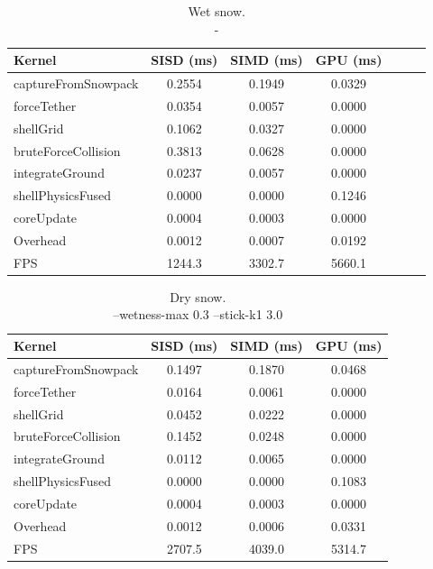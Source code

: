\begin{table}[H]
  \caption{Wet snow. \\-}
  \label{tab:jetson_scenario1_timing}
  \centering
  \scriptsize
  \begin{tabular}{@{}lcccccc@{}}
    \toprule
    \textbf{Kernel} & \textbf{SISD (ms)} & \textbf{SIMD (ms)} & \textbf{GPU (ms)} \\
    \midrule
    captureFromSnowpack           & 0.2554 & 0.1949 & 0.0329 \\
    forceTether                   & 0.0354 & 0.0057 & 0.0000 \\
    shellGrid                     & 0.1062 & 0.0327 & 0.0000 \\
    bruteForceCollision           & 0.3813 & 0.0628 & 0.0000 \\
    integrateGround               & 0.0237 & 0.0057 & 0.0000 \\
    shellPhysicsFused             & 0.0000 & 0.0000 & 0.1246 \\
    coreUpdate                    & 0.0004 & 0.0003 & 0.0000 \\
    Overhead                      & 0.0012 & 0.0007 & 0.0192 \\
    \bottomrule
    FPS                           & 1244.3 & 3302.7 & 5660.1
  \end{tabular}
\end{table}

\begin{table}[H]
  \caption{Dry snow.\\--wetness-max 0.3 --stick-k1 3.0}
  \label{tab:jetson_scenario2_timing}
  \centering
  \scriptsize
  \begin{tabular}{@{}lccc@{}}
    \toprule
    \textbf{Kernel} & \textbf{SISD (ms)} & \textbf{SIMD (ms)} & \textbf{GPU (ms)} \\
    \midrule
    captureFromSnowpack           & 0.1497 & 0.1870 & 0.0468 \\
    forceTether                   & 0.0164 & 0.0061 & 0.0000 \\
    shellGrid                     & 0.0452 & 0.0222 & 0.0000 \\
    bruteForceCollision           & 0.1452 & 0.0248 & 0.0000 \\
    integrateGround               & 0.0112 & 0.0065 & 0.0000 \\
    shellPhysicsFused             & 0.0000 & 0.0000 & 0.1083 \\
    coreUpdate                    & 0.0004 & 0.0003 & 0.0000 \\
    Overhead                      & 0.0012 & 0.0006 & 0.0331 \\
    \bottomrule
    FPS                           & 2707.5 & 4039.0 & 5314.7
  \end{tabular}
\end{table}

